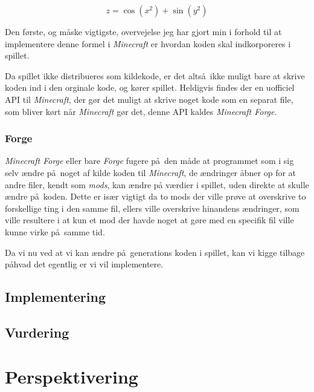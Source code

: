\documentclass[a4paper,12pt]{report}
\begin{document}
		\[z = \cos (x^2) + \sin (y^2)\]

		Den f\o rste, og m\aa ske vigtigste, overvejelse jeg har gjort min i forhold til at implementere denne formel i \emph{Minecraft}
		er hvordan koden skal indkorporeres i spillet.

		Da spillet ikke distribueres som kildekode, er det alts\aa \ ikke muligt bare at skrive koden ind i den orginale kode, og k\o rer spillet.
		Heldigvis findes der en uofficiel API til \emph{Minecraft}, der g\o r det muligt at skrive noget kode som en separat file, som bliver k\o rt
		n\aa r \emph{Minecraft} g\o r det, denne API kaldes \emph{Minecraft Forge}.

		\subsubsection{Forge}
		\emph{Minecraft Forge} eller bare \emph{Forge} fugere p\aa \ den m\aa de at programmet som i sig selv \ae ndre p\aa \ noget af
		kilde koden til \emph{Minecraft}, de \ae ndringer \aa bner op for at andre filer, kendt som \emph{mods}, kan \ae ndre p\aa
		v\ae rdier i spillet, uden direkte at skulle \ae ndre p\aa \ koden. Dette er is\ae r vigtigt da to mods der ville pr\o ve at overskrive
		to forskellige ting i den samme fil, ellers ville overskrive hinandens \ae ndringer, som ville resultere i at kun et mod der havde noget
		at g\o re med en specifik fil ville kunne virke p\aa \ samme tid.

		Da vi nu ved at vi kan \ae ndre p\aa \ generations koden i spillet, kan vi kigge tilbage p\aa hvad det egentlig er vi vil implementere.
	\subsection{Implementering}
	\subsection{Vurdering}
	\section{Perspektivering}
\end{document}
